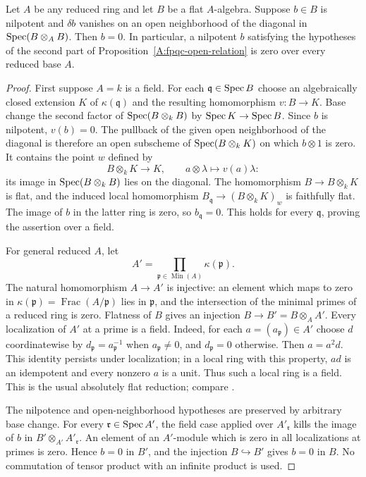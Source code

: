 \begin{proposition}
\label{A:fpqc-reduced-base}
Let $A$ be any reduced ring and let $B$ be a flat $A$-algebra.
Suppose $b\in B$ is nilpotent and $\delta b$ vanishes on an open
neighborhood of the diagonal in $\operatorname{Spec}(B\otimes_A B)$.
Then $b=0$.
In particular, a nilpotent $b$ satisfying the hypotheses of the
second part of Proposition~\ref{A:fpqc-open-relation} is zero over
every reduced base $A$.
\end{proposition}
\begin{proof}
First suppose $A=k$ is a field.  For each $\mathfrak q\in\operatorname{Spec} B$
choose an algebraically closed extension $K$ of $\kappa(\mathfrak q)$
and the resulting homomorphism $v:B\to K$.
Base change the second factor of $\operatorname{Spec}(B\otimes_k B)$ by
$\operatorname{Spec} K\to\operatorname{Spec} B$.  Since $b$ is nilpotent, $v(b)=0$.
The pullback of the given open neighborhood of the diagonal is
therefore an open subscheme of $\operatorname{Spec}(B\otimes_k K)$ on which
$b\otimes1$ is zero.  It contains the point $w$ defined by
\[
 B\otimes_k K\longrightarrow K,
          \qquad a\otimes\lambda\longmapsto v(a)\lambda:
\]
its image in $\operatorname{Spec}(B\otimes_k B)$ lies on the diagonal.
The homomorphism $B\to B\otimes_k K$ is flat, and the induced local
homomorphism $B_{\mathfrak q}\to(B\otimes_k K)_w$ is faithfully
flat.  The image of $b$ in the latter ring is zero, so
$b_{\mathfrak q}=0$.  This holds for every $\mathfrak q$, proving
the assertion over a field.

For general reduced $A$, let
\[
       A'=\prod_{\mathfrak p\in\operatorname{Min}(A)}
                     \kappa(\mathfrak p).
\]
The natural homomorphism $A\to A'$ is injective: an element which
maps to zero in $\kappa(\mathfrak p)=\operatorname{Frac}(A/\mathfrak p)$
lies in $\mathfrak p$, and the intersection of the minimal primes
of a reduced ring is zero.  Flatness of $B$ gives an injection
$B\to B'=B\otimes_A A'$.
Every localization of $A'$ at a prime is a field.  Indeed, for each
$a=(a_{\mathfrak p})\in A'$ choose $d$ coordinatewise by
$d_{\mathfrak p}=a_{\mathfrak p}^{-1}$ when
$a_{\mathfrak p}\ne0$, and $d_{\mathfrak p}=0$ otherwise.
Then $a=a^2d$.  This identity persists under localization; in a
local ring with this property, $ad$ is an idempotent and every
nonzero $a$ is a unit.  Thus such a local ring is a field.
This is the usual absolutely flat reduction; compare
\cite[Lemmas 15.106.6 and 15.106.8]{StacksAbsolutelyFlatFinish}.

The nilpotence and open-neighborhood hypotheses are preserved by
arbitrary base change.  For every $\mathfrak r\in\operatorname{Spec} A'$, the
field case applied over $A'_{\mathfrak r}$ kills the image of $b$
in $B'\otimes_{A'}A'_{\mathfrak r}$.
An element of an $A'$-module which is zero in all localizations
at primes is zero.  Hence $b=0$ in $B'$, and the injection
$B\hookrightarrow B'$ gives $b=0$ in $B$.
No commutation of tensor product with an infinite product is used.
\end{proof}

